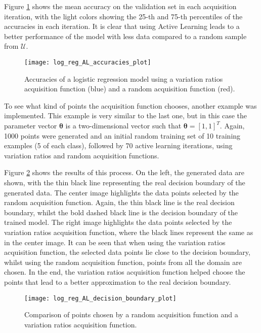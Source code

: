 Figure \ref{fig:log_reg_AL_accuracies_plot} shows the mean accuracy on the validation set in each acquisition iteration, with the light colors showing the 25-th and 75-th percentiles of the accuracies in each iteration. It is clear that using Active Learning leads to a better performance of the model with less data compared to a random sample from $\mathcal{U}$.

\begin{figure}[H]
    \centering
    \texttt{[image: log\_reg\_AL\_accuracies\_plot]}
    \caption{Accuracies of a logistic regression model using a variation ratios acquisition function (blue) and a random acquisition function (red).}
    \label{fig:log_reg_AL_accuracies_plot}
\end{figure}

To see what kind of points the acquisition function chooses, another example was implemented. This example is very similar to the last one, but in this case the parameter vector $\boldsymbol{\theta}$ is a two-dimensional vector such that $\boldsymbol{\theta} = \left[ 1, 1 \right]^T$. Again, 1000 points were generated and an initial random training set of 10 training examples (5 of each class), followed by 70 active learning iterations, using variation ratios and random acquisition functions.

Figure \ref{fig:log_reg_AL_decision_boundary_plot} shows the results of this process. On the left, the generated data are shown, with the thin black line representing the real decision boundary of the generated data. The center image highlights the data points selected by the random acquisition function. Again, the thin black line is the real decision boundary, whilst the bold dashed black line is the decision boundary of the trained model. The right image highlights the data points selected by the variation ratios acquisition function, where the black lines represent the same as in the center image. It can be seen that when using the variation ratios acquisition function, the selected data points lie close to the decision boundary, whilst using the random acquisition function, points from all the domain are chosen. In the end, the variation ratios acquisition function helped choose the points that lead to a better approximation to the real decision boundary.

\begin{figure}[H]
    \centering
    \texttt{[image: log\_reg\_AL\_decision\_boundary\_plot]}
    \caption{Comparison of points chosen by a random acquisition function and a variation ratios acquisition function.}
    \label{fig:log_reg_AL_decision_boundary_plot}
\end{figure}
